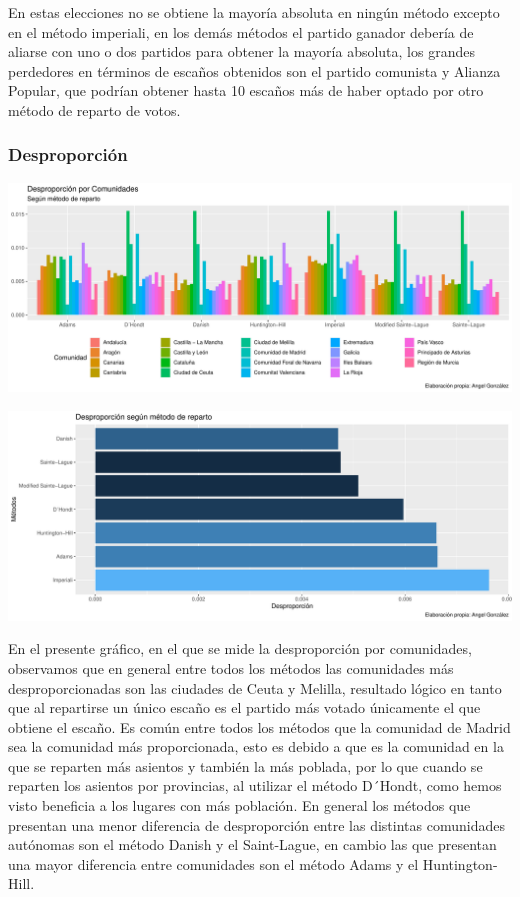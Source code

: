 \documentclass[12pt,a4paper,]{book}
\numberwithin{dummy}{section}
\theoremstyle{ocrenumbox}
\theoremstyle{blacknumex}
\theoremstyle{blacknumbox}
\theoremstyle{ocrenum}
\theoremstyle{ocrenum}
\begin{document}
En estas elecciones no se obtiene la mayoría absoluta en ningún método
excepto en el método imperiali, en los demás métodos el partido ganador
debería de aliarse con uno o dos partidos para obtener la mayoría
absoluta, los grandes perdedores en términos de escaños obtenidos son el
partido comunista y Alianza Popular, que podrían obtener hasta 10
escaños más de haber optado por otro método de reparto de votos.

\hypertarget{desproporciuxf3n}{%
\subsubsection{Desproporción}\label{desproporciuxf3n}}

\begin{center}\includegraphics[width=0.95\linewidth]{figurasR/unnamed-chunk-63-1} \end{center}

\begin{center}\includegraphics[width=0.95\linewidth]{figurasR/unnamed-chunk-63-2} \end{center}

En el presente gráfico, en el que se mide la desproporción por
comunidades, observamos que en general entre todos los métodos las
comunidades más desproporcionadas son las ciudades de Ceuta y Melilla,
resultado lógico en tanto que al repartirse un único escaño es el
partido más votado únicamente el que obtiene el escaño. Es común entre
todos los métodos que la comunidad de Madrid sea la comunidad más
proporcionada, esto es debido a que es la comunidad en la que se
reparten más asientos y también la más poblada, por lo que cuando se
reparten los asientos por provincias, al utilizar el método D´Hondt,
como hemos visto beneficia a los lugares con más población. En general
los métodos que presentan una menor diferencia de desproporción entre
las distintas comunidades autónomas son el método Danish y el
Saint-Lague, en cambio las que presentan una mayor diferencia entre
comunidades son el método Adams y el Huntington-Hill.
\end{document}
